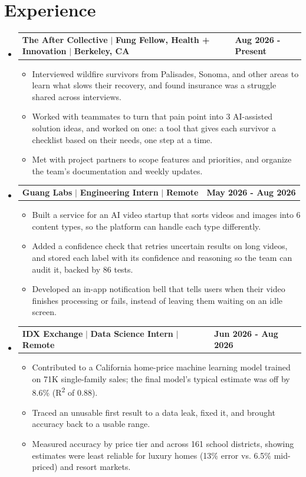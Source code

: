 \documentclass[letterpaper,11pt]{article}
\makeatletter
\newcommand{\resumeItem}[1]{%
  \item\small{{#1\vspace{-2pt}}}%
}
\newcommand{\resumeCompactHeading}[4]{
  \vspace{-1pt}\item
    \begin{tabularx}{1.0\textwidth}[t]{@{}X@{}>{\raggedright\arraybackslash}p{1.5in}@{}}
      \textbf{#1} $|$ \textbf{#2} $|$ \textbf{\small #3} & \textbf{\small #4} \\
    \end{tabularx}\vspace{-3pt}
}
\newcommand{\resumeSubHeadingListStart}{\begin{itemize}[leftmargin=0.0in, label={}]}
\newcommand{\resumeSubHeadingListEnd}{\end{itemize}}
\newcommand{\resumeItemListStart}{\begin{itemize}[itemsep=2.5pt, topsep=3pt]}
\newcommand{\resumeItemListEnd}{\end{itemize}\vspace{-4pt}}
\makeatother
\begin{document}
\section{Experience}
  \resumeSubHeadingListStart

    \resumeCompactHeading
        {The After Collective}{Fung Fellow, Health + Innovation}{Berkeley, CA}{Aug 2026 - Present}
        \resumeItemListStart
            \resumeItem{Interviewed wildfire survivors from Palisades, Sonoma, and other areas to learn what slows their recovery, and found insurance was a struggle shared across interviews.}
            \resumeItem{Worked with teammates to turn that pain point into 3 AI-assisted solution ideas, and worked on one: a tool that gives each survivor a checklist based on their needs, one step at a time.}
            \resumeItem{Met with project partners to scope features and priorities, and organize the team's documentation and weekly updates.}
        \resumeItemListEnd

    \resumeCompactHeading
        {Guang Labs}{Engineering Intern}{Remote}{May 2026 - Aug 2026}
        \resumeItemListStart
            \resumeItem{Built a service for an AI video startup that sorts videos and images into 6 content types, so the platform can handle each type differently.}
            \resumeItem{Added a confidence check that retries uncertain results on long videos, and stored each label with its confidence and reasoning so the team can audit it, backed by 86 tests.}
            \resumeItem{Developed an in-app notification bell that tells users when their video finishes processing or fails, instead of leaving them waiting on an idle screen.}
        \resumeItemListEnd

    \resumeCompactHeading
        {IDX Exchange}{Data Science Intern}{Remote}{Jun 2026 - Aug 2026}
        \resumeItemListStart
            \resumeItem{Contributed to a California home-price machine learning model trained on 71K single-family sales; the final model's typical estimate was off by 8.6\% (R\textsuperscript{2} of 0.88).}
            \resumeItem{Traced an unusable first result to a data leak, fixed it, and brought accuracy back to a usable range.}
            \resumeItem{Measured accuracy by price tier and across 161 school districts, showing estimates were least reliable for luxury homes (13\% error vs. 6.5\% mid-priced) and resort markets.}
        \resumeItemListEnd

  \resumeSubHeadingListEnd
\vspace{-12pt}
\end{document}
